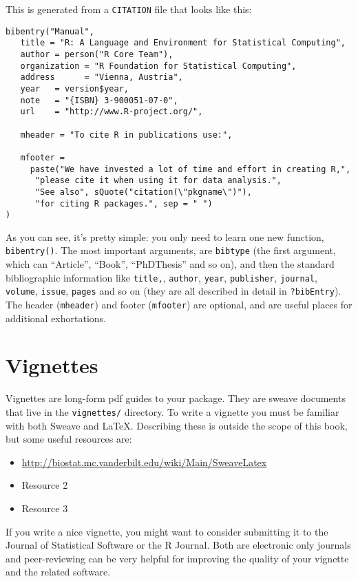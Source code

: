 This is generated from a \texttt{CITATION} file that looks like this:

\begin{verbatim}
bibentry("Manual",
   title = "R: A Language and Environment for Statistical Computing",
   author = person("R Core Team"),
   organization = "R Foundation for Statistical Computing",
   address      = "Vienna, Austria",
   year   = version$year,
   note   = "{ISBN} 3-900051-07-0",
   url    = "http://www.R-project.org/",

   mheader = "To cite R in publications use:",

   mfooter = 
     paste("We have invested a lot of time and effort in creating R,",
      "please cite it when using it for data analysis.",
      "See also", sQuote("citation(\"pkgname\")"),
      "for citing R packages.", sep = " ")
)
\end{verbatim}

As you can see, it's pretty simple: you only need to learn one new
function, \texttt{bibentry()}. The most important arguments, are
\texttt{bibtype} (the first argument, which can ``Article'', ``Book'',
``PhDThesis'' and so on), and then the standard bibliographic
information like \texttt{title,}, \texttt{author}, \texttt{year},
\texttt{publisher}, \texttt{journal}, \texttt{volume}, \texttt{issue},
\texttt{pages} and so on (they are all described in detail in
\texttt{?bibEntry}). The header (\texttt{mheader}) and footer
(\texttt{mfooter}) are optional, and are useful places for additional
exhortations.

\section{Vignettes}

Vignettes are long-form pdf guides to your package. They are sweave
documents that live in the \texttt{vignettes/} directory. To write a
vignette you must be familiar with both Sweave and LaTeX. Describing
these is outside the scope of this book, but some useful resources are:

\begin{itemize}
\itemsep1pt\parskip0pt
\item
  \url{http://biostat.mc.vanderbilt.edu/wiki/Main/SweaveLatex}
\item
  Resource 2
\item
  Resource 3
\end{itemize}

If you write a nice vignette, you might want to consider submitting it
to the Journal of Statistical Software or the R Journal. Both are
electronic only journals and peer-reviewing can be very helpful for
improving the quality of your vignette and the related software.

